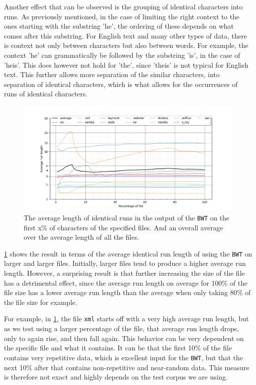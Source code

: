 \documentclass{article}
\begin{document}
Another effect that can be observed is the grouping of identical characters into runs. As previously mentioned, in the case of limiting the right context to the ones starting with the substring 'he\textvisiblespace', the ordering of these depends on what comes after this substring. For English text and many other types of data, there is context not only between characters but also between words. For example, the context '\textvisiblespace he\textvisiblespace' can grammatically be followed by the substring 'is\textvisiblespace', in the case of '\textvisiblespace he\textvisiblespace is\textvisiblespace'. This does however not hold for 'the\textvisiblespace', since 'the\textvisiblespace is\textvisiblespace' is not typical for English text. This further allows more separation of the similar characters, into separation of identical characters, which is what allows for the occurrences of runs of identical characters.
\begin{figure}[H]
    \centering
    \includegraphics[width=\textwidth]{images/avgRunLength.png}
    \caption{The average length of identical runs in the output of the \texttt{BWT} on the first x\% of characters of the specified files. And an overall average over the average length of all the files.}
    \label{avgRunsLengthFigure}
\end{figure}

\cref{avgRunsLengthFigure} shows the result in terms of the average identical run length of using the \texttt{BWT} on larger and larger files. Initially, larger files tend to produce a higher average run length. However, a surprising result is that further increasing the size of the file has a detrimental effect, since the average run length on average for 100\% of the file size has a lower average run length than the average when only taking 80\% of the file size for example.

For example, in \cref{avgRunsLengthFigure}, the file \texttt{xml} starts off with a very high average run length, but as we test using a larger percentage of the file, that average run length drops, only to again rise, and then fall again.
This behavior can be very dependent on the specific file and what it contains. It can be that the first 10\% of the file contains very repetitive data, which is excellent input for the \texttt{BWT}, but that the next 10\% after that contains non-repetitive and near-random data.
This measure is therefore not exact and highly depends on the test corpus we are using.
\end{document}
